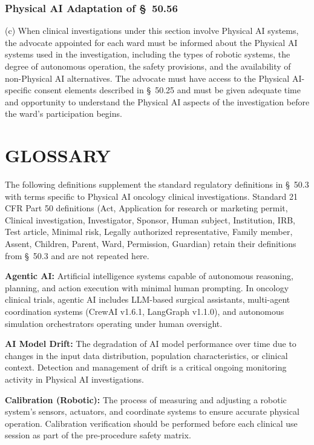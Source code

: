\documentclass[11pt]{article}
\begin{document}
\subsubsection{Physical AI Adaptation of \S~50.56}

(c) When clinical investigations under this section involve Physical AI systems, the advocate appointed for each ward must be informed about the Physical AI systems used in the investigation, including the types of robotic systems, the degree of autonomous operation, the safety provisions, and the availability of non-Physical AI alternatives. The advocate must have access to the Physical AI-specific consent elements described in \S~50.25 and must be given adequate time and opportunity to understand the Physical AI aspects of the investigation before the ward's participation begins.

\clearpage
\section{GLOSSARY}

The following definitions supplement the standard regulatory definitions in \S~50.3 with terms specific to Physical AI oncology clinical investigations. Standard 21 CFR Part 50 definitions (Act, Application for research or marketing permit, Clinical investigation, Investigator, Sponsor, Human subject, Institution, IRB, Test article, Minimal risk, Legally authorized representative, Family member, Assent, Children, Parent, Ward, Permission, Guardian) retain their definitions from \S~50.3 and are not repeated here.

\textbf{Agentic AI:} Artificial intelligence systems capable of autonomous reasoning, planning, and action execution with minimal human prompting. In oncology clinical trials, agentic AI includes LLM-based surgical assistants, multi-agent coordination systems (CrewAI v1.6.1, LangGraph v1.1.0), and autonomous simulation orchestrators operating under human oversight.

\textbf{AI Model Drift:} The degradation of AI model performance over time due to changes in the input data distribution, population characteristics, or clinical context. Detection and management of drift is a critical ongoing monitoring activity in Physical AI investigations.

\textbf{Calibration (Robotic):} The process of measuring and adjusting a robotic system's sensors, actuators, and coordinate systems to ensure accurate physical operation. Calibration verification should be performed before each clinical use session as part of the pre-procedure safety matrix.
\end{document}
